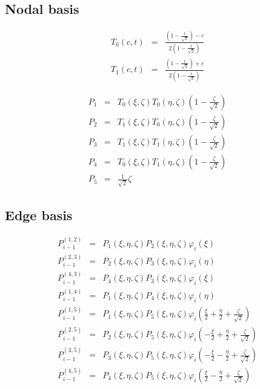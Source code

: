 \subsection{Nodal basis}

\begin{eqnarray*}
T_0(c,t)&=&\frac{(1-\frac{t}{\sqrt{2}})-c}{2(1-\frac{t}{\sqrt{2}})} \\
T_1(c,t)&=&\frac{(1-\frac{t}{\sqrt{2}})+c}{2(1-\frac{t}{\sqrt{2}})}
\end{eqnarray*}

\begin{eqnarray*}
P_1&=&T_0(\xi,\zeta)T_0(\eta,\zeta)(1-\frac{\zeta}{\sqrt{2}}) \\
P_2&=&T_1(\xi,\zeta)T_0(\eta,\zeta)(1-\frac{\zeta}{\sqrt{2}}) \\
P_3&=&T_1(\xi,\zeta)T_1(\eta,\zeta)(1-\frac{\zeta}{\sqrt{2}}) \\
P_4&=&T_0(\xi,\zeta)T_1(\eta,\zeta)(1-\frac{\zeta}{\sqrt{2}}) \\
P_5&=&\frac{1}{\sqrt{2}}\zeta 
\end{eqnarray*}

\subsection{Edge basis}

\begin{eqnarray*}
P_{i-1}^{(1,2)}&=&P_1(\xi,\eta,\zeta)P_2(\xi,\eta,\zeta)\varphi_i(\xi) \\
P_{i-1}^{(2,3)}&=&P_2(\xi,\eta,\zeta)P_3(\xi,\eta,\zeta)\varphi_i(\eta) \\ 
P_{i-1}^{(4,3)}&=&P_4(\xi,\eta,\zeta)P_3(\xi,\eta,\zeta)\varphi_i(\xi) \\
P_{i-1}^{(1,4)}&=&P_1(\xi,\eta,\zeta)P_4(\xi,\eta,\zeta)\varphi_i(\eta) \\
P_{i-1}^{(1,5)}&=&P_1(\xi,\eta,\zeta)P_5(\xi,\eta,\zeta)
\varphi_i(\frac{\xi}{2}+\frac{\eta}{2}+\frac{\zeta}{\sqrt{2}}) \\
P_{i-1}^{(2,5)}&=&P_2(\xi,\eta,\zeta)P_5(\xi,\eta,\zeta) 
\varphi_i(-\frac{\xi}{2}+\frac{\eta}{2}+\frac{\zeta}{\sqrt{2}}) \\
P_{i-1}^{(3,5)}&=&P_3(\xi,\eta,\zeta)P_5(\xi,\eta,\zeta)
\varphi_i(-\frac{\xi}{2}-\frac{\eta}{2}+\frac{\zeta}{\sqrt{2}}) \\
P_{i-1}^{(4,5)}&=&P_4(\xi,\eta,\zeta)P_5(\xi,\eta,\zeta)
\varphi_i(\frac{\xi}{2}-\frac{\eta}{2}+\frac{\zeta}{\sqrt{2}})
\end{eqnarray*}

